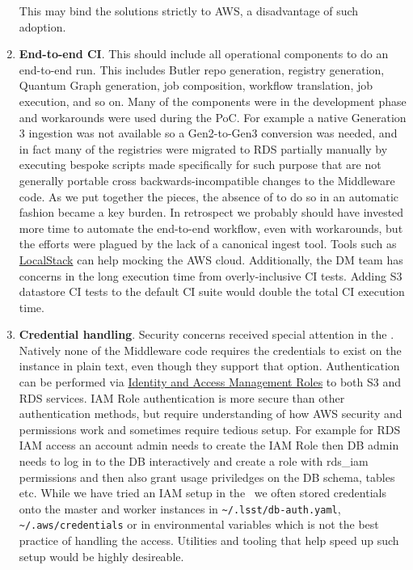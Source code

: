 \begin{enumerate}
This may bind the solutions strictly to AWS, a disadvantage of such adoption.
\item \textbf{End-to-end CI}.
This should include all operational components to do an end-to-end run.
This includes Butler repo generation, registry generation, Quantum Graph generation, job composition, workflow translation, job execution, and so on.
Many of the components were in the development phase and workarounds were used during the PoC.
For example a native Generation 3 ingestion was not available so a Gen2-to-Gen3 conversion was needed, and in fact many of the registries were migrated to RDS partially manually by executing bespoke scripts made specifically for such purpose that are not generally portable cross backwards-incompatible changes to the Middleware code.
As we put together the pieces, the absence of to do so in an automatic fashion became a key burden.
In retrospect we probably should have invested more time to automate the end-to-end workflow, even with workarounds, but the efforts were plagued by the lack of a canonical ingest tool.
Tools such as \href{https://github.com/localstack/localstack}{LocalStack} can help mocking the AWS cloud.
Additionally, the DM team has concerns in the long execution time from overly-inclusive CI tests.
Adding S3 datastore CI tests to the default CI suite would double the total CI execution time.
\item \textbf{Credential handling}.
Security concerns received special attention in the \poc.
Natively none of the Middleware code requires the credentials to exist on the instance in plain text, even though they support that option.
Authentication can be performed via \href{https://docs.aws.amazon.com/IAM/latest/UserGuide/id_roles.html}{Identity and Access Management Roles} to both S3 and RDS services.
IAM Role authentication is more secure than other authentication methods, but require understanding of how AWS security and permissions work and sometimes require tedious setup.
For example for RDS IAM access an account admin needs to create the IAM Role then DB admin needs to log in to the DB interactively and create a role with rds\_iam permissions and then also grant usage priviledges on the DB schema, tables etc.
While we have tried an IAM setup in the \poc~we often stored credentials onto the master and worker instances in \texttt{\~{}/.lsst/db-auth.yaml}, \texttt{\~{}/.aws/credentials} or in environmental variables which is not the best practice of handling the access.
Utilities and tooling that help speed up such setup would be highly desireable.


\end{enumerate}
